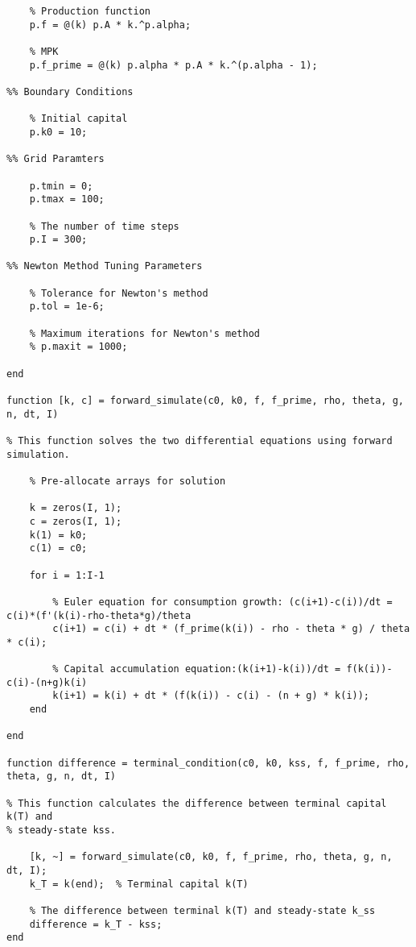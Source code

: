 \begin{lstlisting}
    % Production function
    p.f = @(k) p.A * k.^p.alpha;

    % MPK
    p.f_prime = @(k) p.alpha * p.A * k.^(p.alpha - 1);  

%% Boundary Conditions

    % Initial capital
    p.k0 = 10;

%% Grid Paramters

    p.tmin = 0;
    p.tmax = 100;

    % The number of time steps
    p.I = 300; 

%% Newton Method Tuning Parameters
    
    % Tolerance for Newton's method
    p.tol = 1e-6;  

    % Maximum iterations for Newton's method
    % p.maxit = 1000;  

end

function [k, c] = forward_simulate(c0, k0, f, f_prime, rho, theta, g, n, dt, I)

% This function solves the two differential equations using forward simulation.

    % Pre-allocate arrays for solution

    k = zeros(I, 1);  
    c = zeros(I, 1);  
    k(1) = k0;
    c(1) = c0;
    
    for i = 1:I-1
        
        % Euler equation for consumption growth: (c(i+1)-c(i))/dt = c(i)*(f'(k(i)-rho-theta*g)/theta
        c(i+1) = c(i) + dt * (f_prime(k(i)) - rho - theta * g) / theta * c(i);
        
        % Capital accumulation equation:(k(i+1)-k(i))/dt = f(k(i))-c(i)-(n+g)k(i)
        k(i+1) = k(i) + dt * (f(k(i)) - c(i) - (n + g) * k(i));
    end

end

function difference = terminal_condition(c0, k0, kss, f, f_prime, rho, theta, g, n, dt, I)

% This function calculates the difference between terminal capital k(T) and
% steady-state kss.

    [k, ~] = forward_simulate(c0, k0, f, f_prime, rho, theta, g, n, dt, I);
    k_T = k(end);  % Terminal capital k(T)
    
    % The difference between terminal k(T) and steady-state k_ss
    difference = k_T - kss;  
end

\end{lstlisting}


